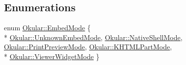 \subsection*{Enumerations}
\begin{DoxyCompactItemize}
\item 
enum \hyperlink{namespaceOkular_adbe21e337d65d3f5f07a441180428ba8}{Okular\+::\+Embed\+Mode} \{ \\*
\hyperlink{namespaceOkular_adbe21e337d65d3f5f07a441180428ba8a3bb7ac1cc6c88ffdec148c8d6c53a811}{Okular\+::\+Unknown\+Embed\+Mode}, 
\hyperlink{namespaceOkular_adbe21e337d65d3f5f07a441180428ba8ae06451e28dfb108642b1c3a61a196145}{Okular\+::\+Native\+Shell\+Mode}, 
\hyperlink{namespaceOkular_adbe21e337d65d3f5f07a441180428ba8a3c886e44dadfdb624559818a85d90b94}{Okular\+::\+Print\+Preview\+Mode}, 
\hyperlink{namespaceOkular_adbe21e337d65d3f5f07a441180428ba8a22dac18ba4f0fded006c596dfe03ce04}{Okular\+::\+K\+H\+T\+M\+L\+Part\+Mode}, 
\\*
\hyperlink{namespaceOkular_adbe21e337d65d3f5f07a441180428ba8aebaf7bae8bd4303bad7c4ca29057c472}{Okular\+::\+Viewer\+Widget\+Mode}
 \}
\end{DoxyCompactItemize}
